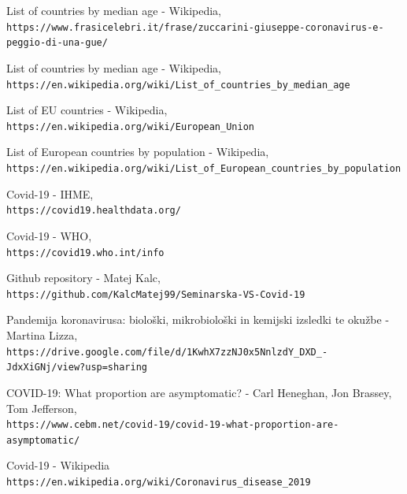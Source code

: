 \documentclass[a4paper,11pt]{article}
\begin{document}
\begin{thebibliography}{9}

List of countries by median age - Wikipedia,
\\\texttt{https://www.frasicelebri.it/frase/zuccarini-giuseppe-coronavirus-e-peggio-di-una-gue/}

List of countries by median age - Wikipedia,
\\\texttt{https://en.wikipedia.org/wiki/List\_of\_countries\_by\_median\_age}

List of EU countries - Wikipedia,
\\\texttt{https://en.wikipedia.org/wiki/European\_Union}


List of European countries by population - Wikipedia,
\\\texttt{https://en.wikipedia.org/wiki/List\_of\_European\_countries\_by\_population}


Covid-19 - IHME,
\\\texttt{https://covid19.healthdata.org/}


Covid-19 - WHO,
\\\texttt{https://covid19.who.int/info}


Github repository - Matej Kalc,
\\\texttt{https://github.com/KalcMatej99/Seminarska-VS-Covid-19}


Pandemija koronavirusa: biološki, mikrobiološki in kemijski izsledki te okužbe - Martina Lizza,
\\\texttt{https://drive.google.com/file/d/1KwhX7zzNJ0x5NnlzdY\_DXD\_-JdxXiGNj/view?usp=sharing}

COVID-19: What proportion are asymptomatic? - Carl Heneghan, Jon Brassey, Tom Jefferson,
\\\texttt{https://www.cebm.net/covid-19/covid-19-what-proportion-are-asymptomatic/}

Covid-19 - Wikipedia
\\\texttt{https://en.wikipedia.org/wiki/Coronavirus\_disease\_2019}



\end{thebibliography}
\end{document}
